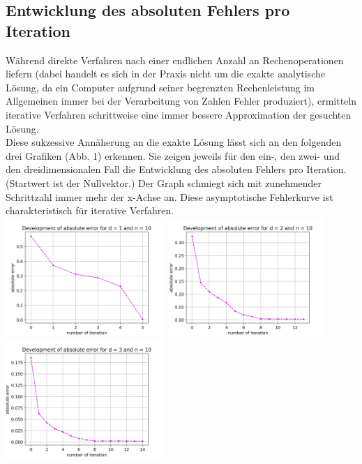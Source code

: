 \documentclass{scrartcl}
\begin{document}
\subsection{Entwicklung des absoluten Fehlers pro Iteration}
Während direkte Verfahren nach einer endlichen Anzahl an Rechenoperationen \grqq{} liefern (dabei handelt es sich in der Praxis nicht um die exakte analytische Lösung, da ein Computer aufgrund seiner begrenzten Rechenleistung im Allgemeinen immer bei der Verarbeitung von Zahlen Fehler produziert), ermitteln iterative Verfahren schrittweise eine immer bessere Approximation der gesuchten Lösung. \\
Diese sukzessive Annäherung an die exakte Lösung lässt sich an den folgenden drei Grafiken (Abb. 1) erkennen.
Sie zeigen jeweils für den ein-, den zwei- und den dreidimensionalen Fall die Entwicklung des absoluten Fehlers pro Iteration.
(Startwert ist der Nullvektor.)
Der Graph schmiegt sich mit zunehmender Schrittzahl immer mehr der x-Achse an.
Diese asymptotische Fehlerkurve ist charakteristisch für iterative Verfahren. \\

{
  \centering
    \includegraphics[width=0.45\textwidth]{Grafiken/iterates_d1_n10}
    \includegraphics[width=0.45\textwidth]{Grafiken/iterates_d2_n10}
    \includegraphics[width=0.45\textwidth]{Grafiken/iterates_d3_n10}
    \vspace{-0.2cm}
}
\vspace{0.5cm}
\end{document}
